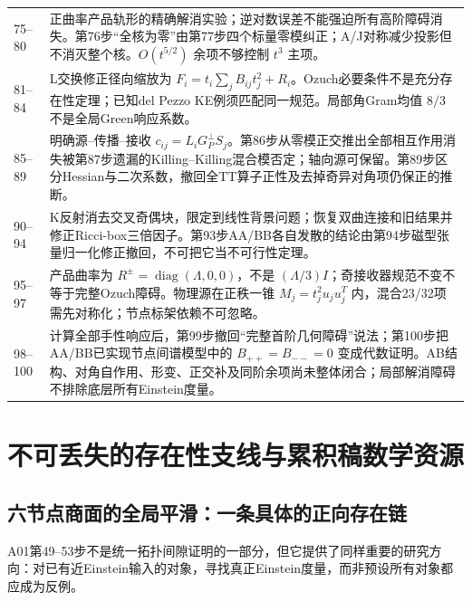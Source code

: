 \documentclass[UTF8,a4paper,11pt,fontset=fandol]{ctexart}
\numberwithin{equation}{section}
\theoremstyle{definition}
\begin{document}
\begin{longtable}{L{.12\textwidth}L{.79\textwidth}}
75--80 & 正曲率产品轨形的精确解消实验；逆对数误差不能强迫所有高阶障碍消失。第76步“全核为零”由第77步四个标量零模纠正；A/J对称减少投影但不消灭整个核。$O(t^{5/2})$ 余项不够控制 $t^3$ 主项。\\
81--84 & L交换修正径向缩放为 $F_i=t_i\sum_jB_{ij}t_j^2+R_i$。Ozuch必要条件不是充分存在性定理；已知del Pezzo KE例须匹配同一规范。局部角Gram均值 $8/3$ 不是全局Green响应系数。\\
85--89 & 明确源--传播--接收 $c_{ij}=L_iG_P^\perp S_j$。第86步从零模正交推出全部相互作用消失被第87步遗漏的Killing--Killing混合模否定；轴向源可保留。第89步区分Hessian与二次系数，撤回全TT算子正性及去掉奇异对角项仍保正的推断。\\
90--94 & K反射消去交叉奇偶块，限定到线性背景问题；恢复双曲连接和旧结果并修正Ricci-box三倍因子。第93步AA/BB各自发散的结论由第94步磁型张量归一化修正撤回，不可把它当不可行性定理。\\
95--97 & 产品曲率为 $R^\pm=\operatorname{diag}(\Lambda,0,0)$，不是 $(\Lambda/3)I$；奇接收器规范不变不等于完整Ozuch障碍。物理源在正秩一锥 $M_j=t_j^2u_ju_j^T$ 内，混合23/32项需先对称化；节点标架依赖不可忽略。\\
98--100 & 计算全部手性响应后，第99步撤回“完整首阶几何障碍”说法；第100步把AA/BB已实现节点间谱模型中的 $B_{++}=B_{--}=0$ 变成代数证明。AB结构、对角自作用、形变、正交补及同阶余项尚未整体闭合；局部解消障碍不排除底层所有Einstein度量。\\\bottomrule
\end{longtable}

\section{不可丢失的存在性支线与累积稿数学资源}
\subsection{六节点商面的全局平滑：一条具体的正向存在链}
A01第49--53步不是统一拓扑间隙证明的一部分，但它提供了同样重要的研究方向：对已有近Einstein输入的对象，寻找真正Einstein度量，而非预设所有对象都应成为反例。
\end{document}

